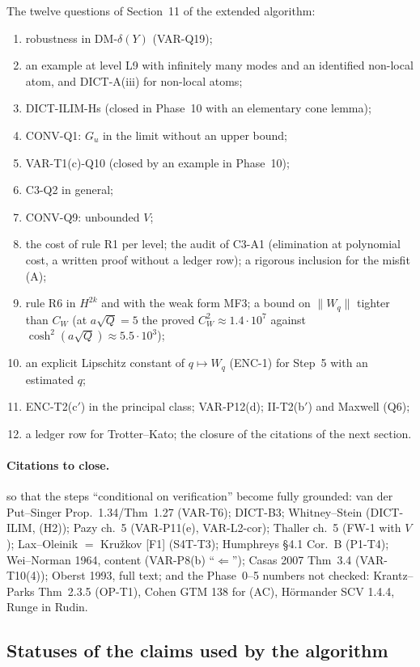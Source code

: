 \documentclass[11pt]{article}
\theoremstyle{plain}
\theoremstyle{definition}
\theoremstyle{remark}
\begin{document}
The twelve questions of Section~11 of the extended algorithm:
\begin{enumerate}
\item robustness in DM-$\delta(Y)$ (VAR-Q19);
\item an example at level L9 with infinitely many modes and an identified non-local atom, and DICT-A(iii) for non-local atoms;
\item DICT-ILIM-Hs (closed in Phase~10 with an elementary cone lemma);
\item CONV-Q1: $G_u$ in the limit without an upper bound;
\item VAR-T1(c)-Q10 (closed by an example in Phase~10);
\item C3-Q2 in general;
\item CONV-Q9: unbounded $V$;
\item the cost of rule R1 per level; the audit of C3-A1 (elimination at polynomial cost, a written proof without a ledger row); a rigorous inclusion for the misfit (A);
\item rule R6 in $H^{2k}$ and with the weak form MF3; a bound on $\|W_q\|$ tighter than $C_W$ (at $a\sqrt Q=5$ the proved $C_W^2\approx1.4\cdot10^7$ against $\cosh^2(a\sqrt Q)\approx5.5\cdot10^3$);
\item an explicit Lipschitz constant of $q\mapsto W_q$ (ENC-1) for Step~5 with an estimated $q$;
\item ENC-T2(c$'$) in the principal class; VAR-P12(d); II-T2(b$'$) and Maxwell (Q6);
\item a ledger row for Trotter--Kato; the closure of the citations of the next section.
\end{enumerate}

\paragraph{Citations to close.} so that the steps ``conditional on verification'' become fully grounded: van der Put--Singer Prop.~1.34/Thm~1.27 (VAR-T6); DICT-B3; Whitney--Stein (DICT-ILIM, (H2)); Pazy ch.~5 (VAR-P11(e), VAR-L2-cor); Thaller ch.~5 (FW-1 with $V$); Lax--Oleinik $=$ Kru\v zkov [F1] (S4T-T3); Humphreys \S4.1 Cor.~B (P1-T4); Wei--Norman 1964, content (VAR-P8(b) ``$\Leftarrow$''); Casas 2007 Thm~3.4 (VAR-T10(4)); Oberst 1993, full text; and the Phase~0--5 numbers not checked: Krantz--Parks Thm~2.3.5 (OP-T1), Cohen GTM 138 for (AC), H\"ormander SCV 1.4.4, Runge in Rudin.

\subsection{Statuses of the claims used by the algorithm}
\end{document}
